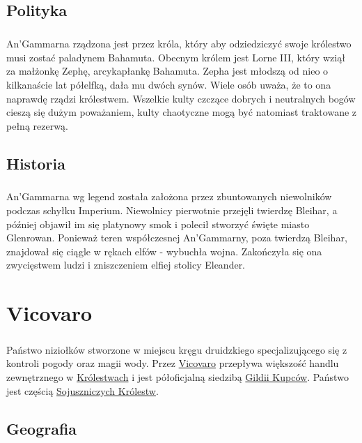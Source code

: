 \section{Polityka}
\paragraph{}
An'Gammarna rządzona jest przez króla, który aby odziedziczyć swoje królestwo musi zostać paladynem Bahamuta.
Obecnym królem jest Lorne III, który wziął za małżonkę Zephę, arcykapłankę Bahamuta.
Zepha jest młodszą od nieo o kilkanaście lat półelfką, dała mu dwóch synów.
Wiele osób uważa, że to ona naprawdę rządzi królestwem.
Wszelkie kulty czczące dobrych i neutralnych bogów cieszą się dużym poważaniem, kulty chaotyczne mogą być natomiast traktowane z pełną rezerwą.

\section{Historia}
\paragraph{}
An'Gammarna wg legend została założona przez zbuntowanych niewolników podczas schyłku Imperium.
Niewolnicy pierwotnie przejęli twierdzę Bleihar, a później objawił im się platynowy smok i polecił stworzyć święte miasto Glenrowan.
Ponieważ teren współczesnej An'Gammarny, poza twierdzą Bleihar, znajdował się ciągle w rękach elfów - wybuchła wojna.
Zakończyła się ona zwycięstwem ludzi i zniszczeniem elfiej stolicy Eleander.

\label{Vicovaro}
\chapter{Vicovaro}

\paragraph{}
Państwo niziołków stworzone w miejscu kręgu druidzkiego specjalizującego się z kontroli pogody oraz magii wody. 
Przez \hyperref[GildiaKupcow]{Vicovaro} przepływa większość handlu zewnętrznego w \hyperref[SojuszniczeKrolestwa]{Królestwach} i jest półoficjalną siedzibą \hyperref[GildiaKupcow]{Gildii Kupców}.
Państwo jest częścią \hyperref[SojuszniczeKrolestwa]{Sojuszniczych Królestw}.

\section{Geografia}
